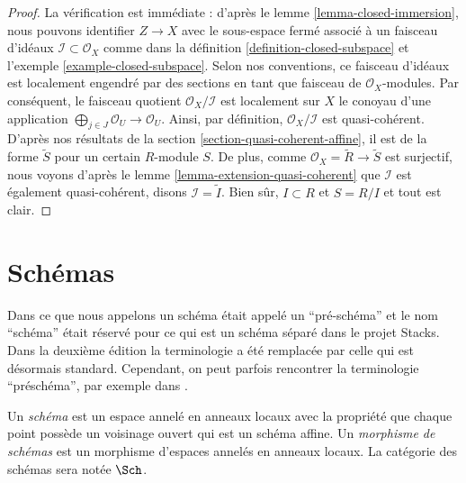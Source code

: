 \begin{proof}
La vérification est immédiate : d'après le lemme \ref{lemma-closed-immersion},
nous pouvons identifier $Z \to X$ avec le sous-espace fermé associé à
un faisceau d'idéaux $\mathcal{I} \subset \mathcal{O}_X$ comme dans
la définition \ref{definition-closed-subspace} et
l'exemple \ref{example-closed-subspace}. Selon
nos conventions, ce faisceau d'idéaux est localement engendré par
des sections en tant que faisceau de $\mathcal{O}_X$-modules.
Par conséquent, le faisceau quotient $\mathcal{O}_X /
\mathcal{I}$ est localement sur $X$
le conoyau d'une application $\bigoplus_{j \in J} \mathcal{O}_U \to
\mathcal{O}_U$. Ainsi, par définition, $\mathcal{O}_X / \mathcal{I}$ est
quasi-cohérent. D'après nos résultats de la section \ref{section-quasi-coherent-affine},
il est de la forme $\widetilde S$ pour un certain
$R$-module $S$. De plus, comme $\mathcal{O}_X = \widetilde R \to \widetilde
S$ est surjectif, nous voyons d'après le lemme \ref{lemma-extension-quasi-coherent}
que $\mathcal{I}$ est également quasi-cohérent, disons $\mathcal{I} =
\widetilde I$. Bien sûr, $I \subset R$ et $S = R/I$ et tout est clair.
\end{proof}













\section{Schémas}
\label{section-schemes}

\begin{definition}
\label{definition-scheme}
\begin{history}
Dans \cite{EGA1} ce que nous appelons un schéma était appelé un ``pré-schéma''
et le nom ``schéma'' était réservé pour ce qui est un schéma séparé
dans le projet Stacks. Dans la deuxième édition \cite{EGA1-second} la terminologie
a été remplacée par celle qui est désormais standard. Cependant, on
peut parfois rencontrer la terminologie ``préschéma'', par exemple dans
\cite{Murre-lectures}.
\end{history}
Un {\it schéma} est un espace annelé en anneaux locaux avec la propriété
que chaque point possède un voisinage ouvert qui est un schéma affine.
Un {\it morphisme de schémas} est un morphisme d'espaces
annelés en anneaux locaux. La catégorie des schémas sera notée
$\Sch$.
\end{definition}

